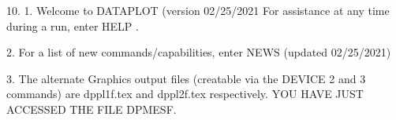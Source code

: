 10.
1. Welcome to DATAPLOT (version 02/25/2021  For assistance at
   any time during a run, enter HELP   .

2. For a list of new commands/capabilities,
   enter NEWS  (updated 02/25/2021)

3. The alternate Graphics output files (creatable
   via the DEVICE 2 and 3 commands) are
   dppl1f.tex and dppl2f.tex respectively.
YOU HAVE JUST ACCESSED THE FILE DPMESF.
